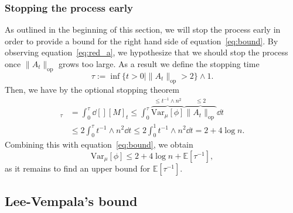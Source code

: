 \subsubsection{Stopping the process early}

As outlined in the beginning of this section, we will stop the process early in order to provide a 
bound for the right hand side of equation~\ref{eq:bound}. By observing equation~\ref{eq:red_a}, we hypothesize that
we should stop the process once \(\|A_t\|_{\text{op}}\) grows too large. As a result we define the stopping time 
\[\tau := \inf\{t > 0 \mid \|A_t\|_{\text{op}} > 2\} \wedge 1.\]
Then, we have by the optional stopping theorem
\begin{align*}
  [M]_\tau & = \int_0^\tau \dd[] [M]_t 
      \le \int_0^\tau \overbrace{\text{Var}_\mu[\phi]}^{\le t^{-1} \wedge n^2} \overbrace{\|A_t\|_{\text{op}}}^{\le 2} \dd t\\
    & \le 2 \int_0^\tau t^{-1} \wedge n^2 \dd t \le 2 \int_0^1 t^{-1} \wedge n^2 \dd t = 2 + 4 \log n.
\end{align*}
Combining this with equation~\ref{eq:bound}, we obtain
\begin{equation}
  \text{Var}_\mu[\phi] \le 2 + 4 \log n + \mathbb{E}[\tau^{-1}],
\end{equation}
as it remains to find an upper bound for \(\mathbb{E}[\tau^{-1}]\).


\subsection{Lee-Vempala's bound}